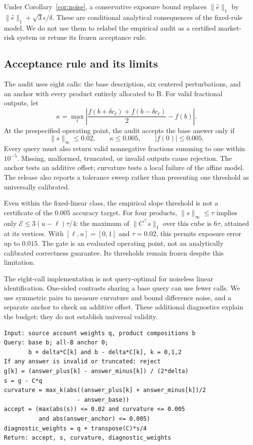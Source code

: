 Under Corollary~\ref{cor:noise}, a conservative exposure bound replaces $\|\widehat e\|_1$ by $\|\widehat e\|_1+\sqrt3\epsilon/\delta$. These are conditional analytical consequences of the fixed-rule model. We do not use them to relabel the empirical audit as a certified market-risk system or retune its frozen acceptance rule.

\subsection{Acceptance rule and its limits}
The audit uses eight calls: the base description, six centered perturbations, and an anchor with every product entirely allocated to B. For valid fractional outputs, let
\begin{equation}
\kappa=\max_\ell\left|\frac{f(b+\delta c_\ell)+f(b-\delta c_\ell)}2-f(b)\right|.
\end{equation}
At the prespecified operating point, the audit accepts the base answer only if
\begin{equation}
\|s\|_\infty\leq0.02,\qquad \kappa\leq0.005,\qquad |f(0)|\leq0.005.\label{eq:accept}
\end{equation}
Every query must also return valid nonnegative fractions summing to one within $10^{-5}$. Missing, malformed, truncated, or invalid outputs cause rejection. The anchor tests an additive offset; curvature tests a local failure of the affine model. The release also reports a tolerance sweep rather than presenting one threshold as universally calibrated.

Even within the fixed-linear class, the empirical slope threshold is not a certificate of the $0.005$ accuracy target. For four products, $\|s\|_\infty\leq\tau$ implies only $\mathcal E\leq3(u-\ell)\tau/4$: the maximum of $\|C^\top s\|_1$ over this cube is $6\tau$, attained at its vertices. With $[\ell,u]=[0,1]$ and $\tau=0.02$, this permits exposure error up to $0.015$. The gate is an evaluated operating point, not an analytically calibrated correctness guarantee. Its thresholds remain frozen despite this limitation.

The eight-call implementation is not query-optimal for noiseless linear identification. One-sided contrasts sharing a base query can use fewer calls. We use symmetric pairs to measure curvature and bound difference noise, and a separate anchor to check an additive offset. These additional diagnostics explain the budget; they do not establish universal validity.

\begin{lstlisting}[caption={Four-product audit. The source structure is supplied by the benchmark.}]
Input: source account weights q, product compositions b
Query: base b; all-B anchor 0;
       b + delta*C[k] and b - delta*C[k], k = 0,1,2
If any answer is invalid or truncated: reject
g[k] = (answer_plus[k] - answer_minus[k]) / (2*delta)
s = g - C*q
curvature = max_k(abs((answer_plus[k] + answer_minus[k])/2
                     - answer_base))
accept = (max(abs(s)) <= 0.02 and curvature <= 0.005
          and abs(answer_anchor) <= 0.005)
diagnostic_weights = q + transpose(C)*s/4
Return: accept, s, curvature, diagnostic_weights
\end{lstlisting}

